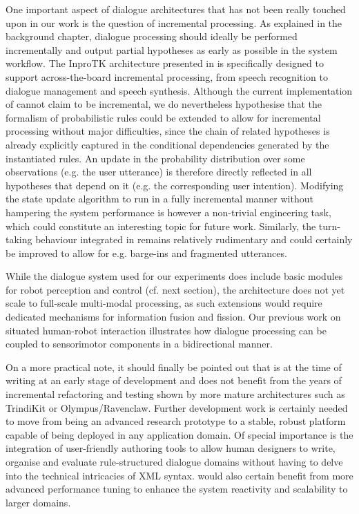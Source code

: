 One important aspect of dialogue architectures that has not been really touched upon in our work is the question of incremental processing.  As explained in the background chapter, dialogue processing should ideally be performed incrementally and output partial hypotheses as early as possible in the system workflow. The InproTK architecture presented in \cite{schlangen2009general,Baumann:2012} is specifically designed to support across-the-board incremental processing, from speech recognition to dialogue management and speech synthesis. Although the current implementation of \opendial cannot claim to be incremental, we do nevertheless hypothesise that the formalism of probabilistic rules could be extended to allow for incremental processing without major difficulties, since the chain of related hypotheses is already explicitly captured in the conditional dependencies generated by the instantiated rules.  An update in the probability distribution over some observations (e.g. the user utterance) is therefore directly reflected in all hypotheses that depend on it (e.g. the corresponding user intention). Modifying the state update algorithm to run in a fully incremental manner without hampering the system performance is however a non-trivial engineering task, which could constitute an interesting topic for future work. Similarly, the turn-taking behaviour integrated in \opendial remains relatively rudimentary and could certainly be improved to allow for e.g. barge-ins and fragmented utterances.

While the dialogue system used for our experiments does include basic modules for robot perception and control (cf. next section), the architecture does not yet scale to full-scale multi-modal processing, as such extensions would require dedicated mechanisms for information fusion and fission. Our previous work on situated human-robot interaction \citep{cosybook:dialogue} illustrates how dialogue processing can be coupled to sensorimotor components in a bidirectional manner.  

On a more practical note, it should finally be pointed out that \opendial is at the time of writing at an early stage of development and does not benefit from the years of incremental refactoring and testing shown by more mature architectures such as TrindiKit or Olympus/Ravenclaw. Further development work is certainly needed to move \opendial from being an advanced research prototype to a stable, robust platform capable of being deployed in any application domain. Of special importance is the integration of user-friendly authoring tools to allow human designers to write, organise and evaluate rule-structured dialogue domains without having to delve into the technical intricacies of XML syntax. \opendial would also certain benefit from more advanced performance tuning to enhance the system reactivity and scalability to larger domains. 


